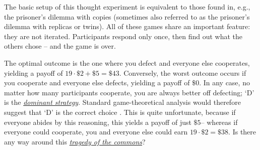 The basic setup of this thought experiment is equivalent to those found
in, e.g., the prisoner's dilemma with copies (sometimes also referred to
as the prisoner's dilemma with replicas or twins). All of these games
share an important feature: they are not iterated. Participants respond
only once, then find out what the others chose -- and the game is over.

The optimal outcome is the one where you defect and everyone else
cooperates, yielding a payoff of \(19 \cdot \$ 2 + \$ 5 = \$ 43\).
Conversely, the worst outcome occurs if you cooperate and everyone else
defects, yielding a payoff of \(\$ 0\). In any case, no matter how many
participants cooperate, you are always better off defecting; `D' is the
\href{https://en.wikipedia.org/wiki/Strategic_dominance}{\emph{dominant
strategy}}. Standard game-theoretical analysis would therefore suggest
that `D' is the correct choice
\parencite{Binmore2007-uc,Osborne2004-ui}. This is quite
unfortunate, because if everyone abides by this reasoning, this yields a
payoff of just \(\$ 5\)-- whereas if everyone could cooperate, you and
everyone else could earn \(19 \cdot \$ 2 = \$ 38\). Is there any way
around this
\href{https://en.wikipedia.org/wiki/Tragedy_of_the_commons}{\emph{tragedy
of the commons}}?

